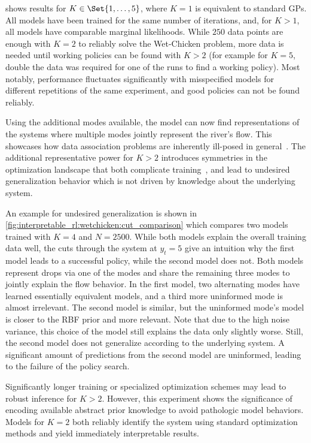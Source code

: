  shows results for $K \in \Set{1, \dots, 5}$, where $K=1$ is equivalent to standard GPs.
All models have been trained for the same number of iterations, and, for $K > 1$, all models have comparable marginal likelihoods.
While $250$ data points are enough with $K=2$ to reliably solve the Wet-Chicken problem, more data is needed until working policies can be found with $K>2$ (for example for $K=5$, double the data was required for one of the runs to find a working policy).
Most notably, performance fluctuates significantly with misspecified models for different repetitions of the same experiment, and good policies can not be found reliably.

Using the additional modes available, the model can now find representations of the systems where multiple modes jointly represent the river's flow.
This showcases how data association problems are inherently ill-posed in general~\parencite{barshalom_tracking_1990,cox_review_1993}.
The additional representative power for $K>2$ introduces symmetries in the optimization landscape that both complicate training~\parencite{lazaro-gredilla_overlapping_2012,minka_expectation_2001}, and lead to undesired generalization behavior which is not driven by knowledge about the underlying system.

An example for undesired generalization is shown in \cref{fig:interpretable_rl:wetchicken:cut_comparison} which compares two models trained with $K=4$ and $N=2500$.
While both models explain the overall training data well, the cuts through the system at $y_t = 5$ give an intuition why the first model leads to a successful policy, while the second model does not.
Both models represent drops via one of the modes and share the remaining three modes to jointly explain the flow behavior.
In the first model, two alternating modes have learned essentially equivalent models, and a third more uninformed mode is almost irrelevant.
The second model is similar, but the uninformed mode's model is closer to the RBF prior and more relevant.
Note that due to the high noise variance, this choice of the model still explains the data only slightly worse.
Still, the second model does not generalize according to the underlying system.
A significant amount of predictions from the second model are uninformed, leading to the failure of the policy search.

Significantly longer training or specialized optimization schemes may lead to robust inference for $K>2$.
However, this experiment shows the significance of encoding available abstract prior knowledge to avoid pathologic model behaviors.
Models for $K=2$ both reliably identify the system using standard optimization methods and yield immediately interpretable results.


